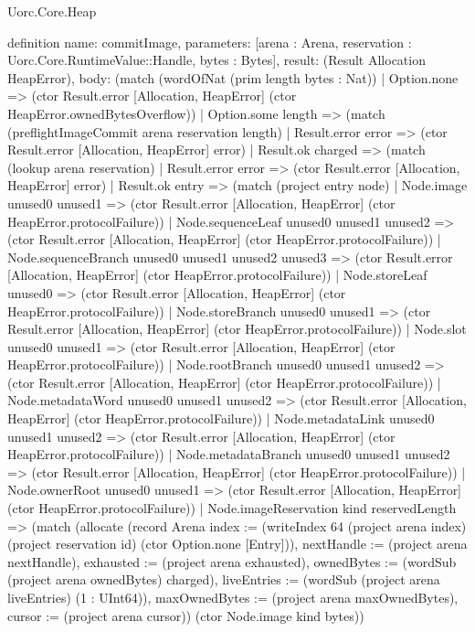 \begin{lexlean}{Uorc.Core.Heap}
\begin{semanticmodule}
definition{
  name: commitImage,
  parameters: [arena : Arena, reservation : Uorc.Core.RuntimeValue::Handle, bytes : Bytes],
  result: (Result Allocation HeapError),
  body: (match (wordOfNat (prim length bytes : Nat))
    | Option.none => (ctor Result.error [Allocation, HeapError] (ctor HeapError.ownedBytesOverflow))
    | Option.some length => (match (preflightImageCommit arena reservation length)
      | Result.error error => (ctor Result.error [Allocation, HeapError] error)
      | Result.ok charged => (match (lookup arena reservation)
        | Result.error error => (ctor Result.error [Allocation, HeapError] error)
        | Result.ok entry => (match (project entry node)
          | Node.image unused0 unused1 => (ctor Result.error [Allocation, HeapError] (ctor HeapError.protocolFailure))
          | Node.sequenceLeaf unused0 unused1 unused2 => (ctor Result.error [Allocation, HeapError] (ctor HeapError.protocolFailure))
          | Node.sequenceBranch unused0 unused1 unused2 unused3 => (ctor Result.error [Allocation, HeapError] (ctor HeapError.protocolFailure))
          | Node.storeLeaf unused0 => (ctor Result.error [Allocation, HeapError] (ctor HeapError.protocolFailure))
          | Node.storeBranch unused0 unused1 => (ctor Result.error [Allocation, HeapError] (ctor HeapError.protocolFailure))
          | Node.slot unused0 unused1 => (ctor Result.error [Allocation, HeapError] (ctor HeapError.protocolFailure))
          | Node.rootBranch unused0 unused1 unused2 => (ctor Result.error [Allocation, HeapError] (ctor HeapError.protocolFailure))
          | Node.metadataWord unused0 unused1 unused2 => (ctor Result.error [Allocation, HeapError] (ctor HeapError.protocolFailure))
          | Node.metadataLink unused0 unused1 unused2 => (ctor Result.error [Allocation, HeapError] (ctor HeapError.protocolFailure))
          | Node.metadataBranch unused0 unused1 unused2 => (ctor Result.error [Allocation, HeapError] (ctor HeapError.protocolFailure))
          | Node.ownerRoot unused0 unused1 => (ctor Result.error [Allocation, HeapError] (ctor HeapError.protocolFailure))
          | Node.imageReservation kind reservedLength => (match (allocate (record Arena {index := (writeIndex 64 (project arena index) (project reservation id) (ctor Option.none [Entry])), nextHandle := (project arena nextHandle), exhausted := (project arena exhausted), ownedBytes := (wordSub (project arena ownedBytes) charged), liveEntries := (wordSub (project arena liveEntries) (1 : UInt64)), maxOwnedBytes := (project arena maxOwnedBytes), cursor := (project arena cursor)}) (ctor Node.image kind bytes))
}
\end{semanticmodule}
\end{lexlean}
